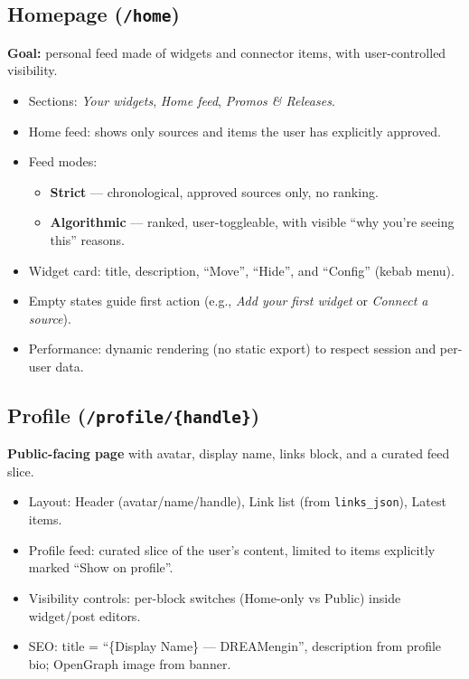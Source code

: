\documentclass[11pt]{article}
\begin{document}
\subsection{Homepage (\texttt{/home})}
\textbf{Goal:} personal feed made of widgets and connector items, with user-controlled visibility.
\begin{itemize}
  \item Sections: \emph{Your widgets}, \emph{Home feed}, \emph{Promos \& Releases}.
  \item Home feed: shows only sources and items the user has explicitly approved.
  \item Feed modes:
    \begin{itemize}
      \item \textbf{Strict} --- chronological, approved sources only, no ranking.
      \item \textbf{Algorithmic} --- ranked, user-toggleable, with visible ``why you're seeing this'' reasons.
    \end{itemize}
  \item Widget card: title, description, ``Move'', ``Hide'', and ``Config'' (kebab menu).
  \item Empty states guide first action (e.g., \emph{Add your first widget} or \emph{Connect a source}).
  \item Performance: dynamic rendering (no static export) to respect session and per-user data.
\end{itemize}

\subsection{Profile (\texttt{/profile/\{handle\}})}
\textbf{Public-facing page} with avatar, display name, links block, and a curated feed slice.
\begin{itemize}
  \item Layout: Header (avatar/name/handle), Link list (from \texttt{links\_json}), Latest items.
  \item Profile feed: curated slice of the user's content, limited to items explicitly marked ``Show on profile''.
  \item Visibility controls: per-block switches (Home-only vs Public) inside widget/post editors.
  \item SEO: title = ``\{Display Name\} --- DREAMengin'', description from profile bio; OpenGraph image from banner.
\end{itemize}
\end{document}
